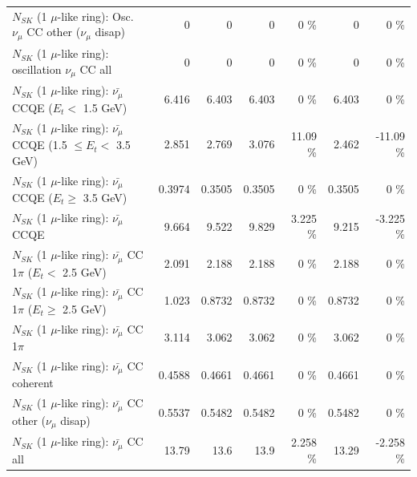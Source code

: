 \begin{table}
\begin{tabular}{| l | r | r | r  r | r  r |}
         $N_{SK}$ (1 $\mu$-like ring): Osc. $\nu_\mu$ CC other ($\nu_\mu$ disap) &               0 &               0 &               0 &        0 \%  &               0 &        0 \%  \\ 
                      $N_{SK}$ (1 $\mu$-like ring): oscillation $\nu_\mu$ CC all &               0 &               0 &               0 &        0 \%  &               0 &        0 \%  \\ 
\hline
\hline
          $N_{SK}$ (1 $\mu$-like ring): $\bar{\nu_\mu}$ CCQE ($E_{t} <$ 1.5 GeV) &           6.416 &           6.403 &           6.403 &        0 \%  &           6.403 &        0 \%  \\ 
 $N_{SK}$ (1 $\mu$-like ring): $\bar{\nu_\mu}$ CCQE (1.5 $\leq E_{t} <$ 3.5 GeV) &           2.851 &           2.769 &           3.076 &    11.09 \%  &           2.462 &   -11.09 \%  \\ 
       $N_{SK}$ (1 $\mu$-like ring): $\bar{\nu_\mu}$ CCQE ($E_{t} \geq$ 3.5 GeV) &          0.3974 &          0.3505 &          0.3505 &        0 \%  &          0.3505 &        0 \%  \\ 
\hline
                              $N_{SK}$ (1 $\mu$-like ring): $\bar{\nu_\mu}$ CCQE &           9.664 &           9.522 &           9.829 &    3.225 \%  &           9.215 &   -3.225 \%  \\ 
\hline
     $N_{SK}$ (1 $\mu$-like ring): $\bar{\nu_\mu}$ CC 1$\pi$ ($E_{t} <$ 2.5 GeV) &           2.091 &           2.188 &           2.188 &        0 \%  &           2.188 &        0 \%  \\ 
  $N_{SK}$ (1 $\mu$-like ring): $\bar{\nu_\mu}$ CC 1$\pi$ ($E_{t} \geq$ 2.5 GeV) &           1.023 &          0.8732 &          0.8732 &        0 \%  &          0.8732 &        0 \%  \\ 
\hline
                         $N_{SK}$ (1 $\mu$-like ring): $\bar{\nu_\mu}$ CC 1$\pi$ &           3.114 &           3.062 &           3.062 &        0 \%  &           3.062 &        0 \%  \\ 
                       $N_{SK}$ (1 $\mu$-like ring): $\bar{\nu_\mu}$ CC coherent &          0.4588 &          0.4661 &          0.4661 &        0 \%  &          0.4661 &        0 \%  \\ 
        $N_{SK}$ (1 $\mu$-like ring): $\bar{\nu_\mu}$ CC other ($\nu_\mu$ disap) &          0.5537 &          0.5482 &          0.5482 &        0 \%  &          0.5482 &        0 \%  \\ 
                          $N_{SK}$ (1 $\mu$-like ring): $\bar{\nu_{\mu}}$ CC all &           13.79 &            13.6 &            13.9 &    2.258 \%  &           13.29 &   -2.258 \%  \\ 

\end{tabular}
\end{table}
